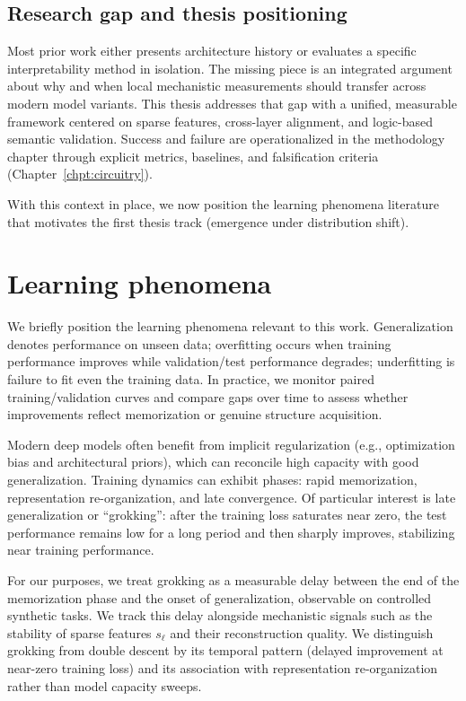\documentclass[../ppgc-tese.tex]{subfiles}
\begin{document}
\subsection*{Research gap and thesis positioning}
\label{sec:research-gap-positioning}
Most prior work either presents architecture history or evaluates a specific interpretability method in isolation. The missing piece is an integrated argument about why and when local mechanistic measurements should transfer across modern model variants. This thesis addresses that gap with a unified, measurable framework centered on sparse features, cross-layer alignment, and logic-based semantic validation. Success and failure are operationalized in the methodology chapter through explicit metrics, baselines, and falsification criteria (Chapter~\ref{chpt:circuitry}).

With this context in place, we now position the learning phenomena literature that motivates the first thesis track (emergence under distribution shift).

\section{Learning phenomena}
We briefly position the learning phenomena relevant to this work. Generalization denotes performance on unseen data; overfitting occurs when training performance improves while validation/test performance degrades; underfitting is failure to fit even the training data. In practice, we monitor paired training/validation curves and compare gaps over time to assess whether improvements reflect memorization or genuine structure acquisition.

Modern deep models often benefit from implicit regularization (e.g., optimization bias and architectural priors), which can reconcile high capacity with good generalization. Training dynamics can exhibit phases: rapid memorization, representation re-organization, and late convergence. Of particular interest is late generalization or ``grokking'': after the training loss saturates near zero, the test performance remains low for a long period and then sharply improves, stabilizing near training performance.

For our purposes, we treat grokking as a measurable delay between the end of the memorization phase and the onset of generalization, observable on controlled synthetic tasks. We track this delay alongside mechanistic signals such as the stability of sparse features $s_\ell$ and their reconstruction quality. We distinguish grokking from double descent by its temporal pattern (delayed improvement at near-zero training loss) and its association with representation re-organization rather than model capacity sweeps.
\end{document}
